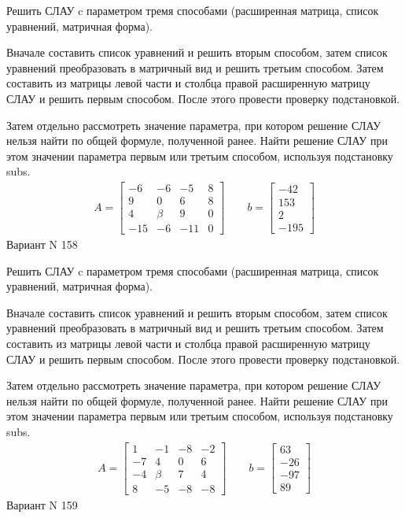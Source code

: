 \documentclass[11pt]{report}
\begin{document}
Решить СЛАУ c параметром тремя способами (расширенная матрица, список уравнений, матричная форма).

Вначале составить список уравнений и решить вторым способом,
затем список уравнений преобразовать в матричный вид и решить третьим способом.
Затем составить из матрицы левой части и столбца правой расширенную матрицу СЛАУ и решить первым способом.
После этого провести проверку подстановкой.

Затем отдельно рассмотреть значение параметра, при котором решение СЛАУ нельзя найти по общей формуле,
полученной ранее.
Найти решение СЛАУ при этом значении параметра первым или третьим способом, используя подстановку subs.
\begin{align*}
    A = \left[\begin{matrix}-6 & -6 & -5 & 8\\9 & 0 & 6 & 8\\4 & \beta & 9 & 0\\-15 & -6 & -11 & 0\end{matrix}\right]
\qquad b = \left[\begin{matrix}-42\\153\\2\\-195\end{matrix}\right]
\end{align*}
\newpage
Вариант N 158


Решить СЛАУ c параметром тремя способами (расширенная матрица, список уравнений, матричная форма).

Вначале составить список уравнений и решить вторым способом,
затем список уравнений преобразовать в матричный вид и решить третьим способом.
Затем составить из матрицы левой части и столбца правой расширенную матрицу СЛАУ и решить первым способом.
После этого провести проверку подстановкой.

Затем отдельно рассмотреть значение параметра, при котором решение СЛАУ нельзя найти по общей формуле,
полученной ранее.
Найти решение СЛАУ при этом значении параметра первым или третьим способом, используя подстановку subs.
\begin{align*}
    A = \left[\begin{matrix}1 & -1 & -8 & -2\\-7 & 4 & 0 & 6\\-4 & \beta & 7 & 4\\8 & -5 & -8 & -8\end{matrix}\right]
\qquad b = \left[\begin{matrix}63\\-26\\-97\\89\end{matrix}\right]
\end{align*}
\newpage
Вариант N 159
\end{document}
